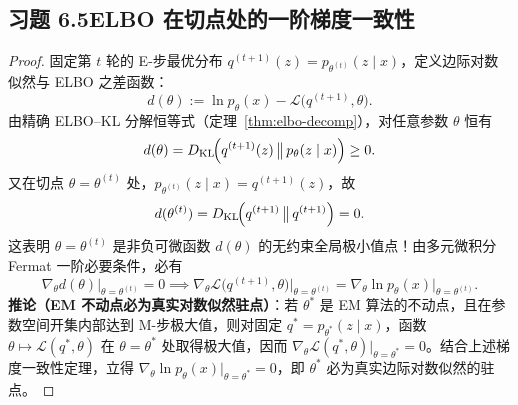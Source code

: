 \subsection*{习题 6.5\quad ELBO 在切点处的一阶梯度一致性}
\begin{proof}
固定第 $t$ 轮的 E-步最优分布 $q^{(t+1)}(z) = p_{\theta^{(t)}}(z \mid x)$，定义边际对数似然与 ELBO 之差函数：
\[
  d(\theta) := \ln p_\theta(x) - \mathcal{L}\big(q^{(t+1)}, \theta\big).
\]
由精确 ELBO--KL 分解恒等式（定理~\ref{thm:elbo-decomp}），对任意参数 $\theta$ 恒有
\[
  d(\theta) = D_{\mathrm{KL}}\!\Big(q^{(t+1)}(z) \,\big\|\, p_\theta(z \mid x)\Big) \ge 0.
\]
又在切点 $\theta = \theta^{(t)}$ 处，$p_{\theta^{(t)}}(z \mid x) = q^{(t+1)}(z)$，故
\[
  d(\theta^{(t)}) = D_{\mathrm{KL}}\!\Big(q^{(t+1)} \,\big\|\, q^{(t+1)}\Big) = 0.
\]
这表明 $\theta = \theta^{(t)}$ 是非负可微函数 $d(\theta)$ 的无约束全局极小值点！由多元微积分 Fermat 一阶必要条件，必有
\[
  \nabla_\theta d(\theta)\Big|_{\theta = \theta^{(t)}} = 0
  \implies \nabla_\theta \mathcal{L}\big(q^{(t+1)}, \theta\big)\Big|_{\theta = \theta^{(t)}}
  = \nabla_\theta \ln p_\theta(x)\Big|_{\theta = \theta^{(t)}}.
\]
\textbf{推论（EM 不动点必为真实对数似然驻点）}：若 $\theta^*$ 是 EM 算法的不动点，且在参数空间开集内部达到 M-步极大值，则对固定 $q^* = p_{\theta^*}(z \mid x)$，函数 $\theta \mapsto \mathcal{L}(q^*, \theta)$ 在 $\theta = \theta^*$ 处取得极大值，因而 $\nabla_\theta \mathcal{L}(q^*, \theta)\big|_{\theta=\theta^*} = 0$。结合上述梯度一致性定理，立得 $\nabla_\theta \ln p_\theta(x)\big|_{\theta=\theta^*} = 0$，即 $\theta^*$ 必为真实边际对数似然的驻点。
\end{proof}

